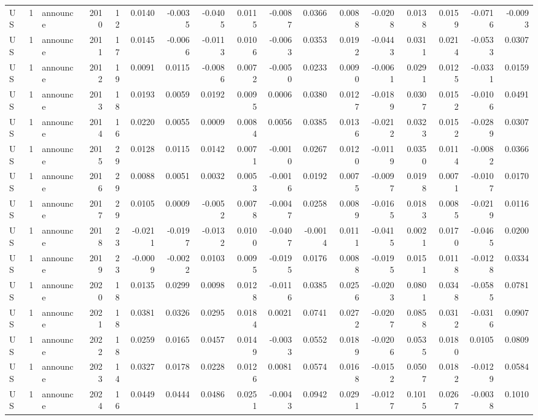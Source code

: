 \begin{tabular}{lrlrrrrrrrrrrrrrr}
US & 1 & announce & 2010 & 12 & 0.0140 & -0.0035 & -0.0405 & 0.0115 & -0.0087 & 0.0366 & 0.0088 & -0.0208 & 0.0138 & 0.0159 & -0.0716 & -0.0093 \\
US & 1 & announce & 2011 & 17 & 0.0145 & -0.0066 & -0.0113 & 0.0106 & -0.0063 & 0.0353 & 0.0192 & -0.0443 & 0.0311 & 0.0214 & -0.0533 & 0.0307 \\
US & 1 & announce & 2012 & 19 & 0.0091 & 0.0115 & -0.0086 & 0.0072 & -0.0050 & 0.0233 & 0.0090 & -0.0061 & 0.0291 & 0.0125 & -0.0331 & 0.0159 \\
US & 1 & announce & 2013 & 18 & 0.0193 & 0.0059 & 0.0192 & 0.0095 & 0.0006 & 0.0380 & 0.0127 & -0.0189 & 0.0307 & 0.0152 & -0.0106 & 0.0491 \\
US & 1 & announce & 2014 & 16 & 0.0220 & 0.0055 & 0.0009 & 0.0084 & 0.0056 & 0.0385 & 0.0136 & -0.0212 & 0.0323 & 0.0152 & -0.0289 & 0.0307 \\
US & 1 & announce & 2015 & 29 & 0.0128 & 0.0115 & 0.0142 & 0.0071 & -0.0010 & 0.0267 & 0.0120 & -0.0119 & 0.0350 & 0.0114 & -0.0082 & 0.0366 \\
US & 1 & announce & 2016 & 29 & 0.0088 & 0.0051 & 0.0032 & 0.0053 & -0.0016 & 0.0192 & 0.0075 & -0.0097 & 0.0198 & 0.0071 & -0.0107 & 0.0170 \\
US & 1 & announce & 2017 & 29 & 0.0105 & 0.0009 & -0.0052 & 0.0078 & -0.0047 & 0.0258 & 0.0089 & -0.0165 & 0.0183 & 0.0085 & -0.0219 & 0.0116 \\
US & 1 & announce & 2018 & 23 & -0.0211 & -0.0197 & -0.0132 & 0.0100 & -0.0407 & -0.0014 & 0.0111 & -0.0415 & 0.0021 & 0.0170 & -0.0465 & 0.0200 \\
US & 1 & announce & 2019 & 23 & -0.0009 & -0.0022 & 0.0103 & 0.0095 & -0.0195 & 0.0176 & 0.0088 & -0.0195 & 0.0151 & 0.0118 & -0.0128 & 0.0334 \\
US & 1 & announce & 2020 & 18 & 0.0135 & 0.0299 & 0.0098 & 0.0128 & -0.0116 & 0.0385 & 0.0256 & -0.0203 & 0.0801 & 0.0348 & -0.0585 & 0.0781 \\
US & 1 & announce & 2021 & 18 & 0.0381 & 0.0326 & 0.0295 & 0.0184 & 0.0021 & 0.0741 & 0.0272 & -0.0207 & 0.0858 & 0.0312 & -0.0316 & 0.0907 \\
US & 1 & announce & 2022 & 18 & 0.0259 & 0.0165 & 0.0457 & 0.0149 & -0.0033 & 0.0552 & 0.0189 & -0.0206 & 0.0535 & 0.0180 & 0.0105 & 0.0809 \\
US & 1 & announce & 2023 & 14 & 0.0327 & 0.0178 & 0.0228 & 0.0126 & 0.0081 & 0.0574 & 0.0168 & -0.0152 & 0.0507 & 0.0182 & -0.0129 & 0.0584 \\
US & 1 & announce & 2024 & 16 & 0.0449 & 0.0444 & 0.0486 & 0.0251 & -0.0043 & 0.0942 & 0.0291 & -0.0127 & 0.1015 & 0.0267 & -0.0038 & 0.1010 \\

\end{tabular}

